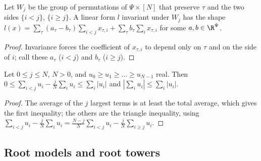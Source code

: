 \begin{lemma}\label{pf:volthm:lem:invlin}
Let $W_j$ be the group of permutations of $\Psi\times[N]$ that preserve $\tau$ and the two sides $\{i<j\}$,
$\{i\ge j\}$. A linear form $l$ invariant under $W_j$ has the shape
$l(x)=\sum_\tau(a_\tau-b_\tau)\sum_{i<j}x_{\tau,i}+\sum_\tau b_\tau\sum_ix_{\tau,i}$ for some
$a,b\in\R^\Psi$.
\end{lemma}

\begin{proof}
Invariance forces the coefficient of $x_{\tau,i}$ to depend only on $\tau$ and on the side of $i$; call
these $a_\tau$ ($i<j$) and $b_\tau$ ($i\ge j$).
\end{proof}

\begin{lemma}\label{pf:volthm:lem:partial}
Let $0\le j\le N$, $N>0$, and $u_0\ge u_1\ge\dots\ge u_{N-1}$ real. Then
$0\le\sum_{i<j}u_i-\frac jN\sum_iu_i\le\sum_i|u_i|$ and $|\sum_iu_i|\le\sum_i|u_i|$.
\end{lemma}

\begin{proof}
The average of the $j$ largest terms is at least the total average, which gives the first inequality; the
others are the triangle inequality, using $\sum_{i<j}u_i-\frac jN\sum_iu_i=\frac{N-j}{N}\sum_{i<j}u_i-
\frac jN\sum_{i\ge j}u_i$.
\end{proof}

\subsection{Root models and root towers}\label{pf:volthm:sec:models}

